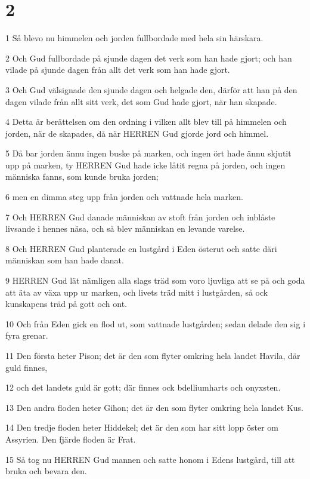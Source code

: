 \chapter{2}

\par 1 Så blevo nu himmelen och jorden fullbordade med hela sin härskara.
\par 2 Och Gud fullbordade på sjunde dagen det verk som han hade gjort; och han vilade på sjunde dagen från allt det verk som han hade gjort.
\par 3 Och Gud välsignade den sjunde dagen och helgade den, därför att han på den dagen vilade från allt sitt verk, det som Gud hade gjort, när han skapade.
\par 4 Detta är berättelsen om den ordning i vilken allt blev till på himmelen och jorden, när de skapades, då när HERREN Gud gjorde jord och himmel.
\par 5 Då bar jorden ännu ingen buske på marken, och ingen ört hade ännu skjutit upp på marken, ty HERREN Gud hade icke låtit regna på jorden, och ingen människa fanns, som kunde bruka jorden;
\par 6 men en dimma steg upp från jorden och vattnade hela marken.
\par 7 Och HERREN Gud danade människan av stoft från jorden och inblåste livsande i hennes näsa, och så blev människan en levande varelse.
\par 8 Och HERREN Gud planterade en lustgård i Eden österut och satte däri människan som han hade danat.
\par 9 HERREN Gud lät nämligen alla slags träd som voro ljuvliga att se på och goda att äta av växa upp ur marken, och livets träd mitt i lustgården, så ock kunskapens träd på gott och ont.
\par 10 Och från Eden gick en flod ut, som vattnade lustgården; sedan delade den sig i fyra grenar.
\par 11 Den första heter Pison; det är den som flyter omkring hela landet Havila, där guld finnes,
\par 12 och det landets guld är gott; där finnes ock bdelliumharts och onyxsten.
\par 13 Den andra floden heter Gihon; det är den som flyter omkring hela landet Kus.
\par 14 Den tredje floden heter Hiddekel; det är den som har sitt lopp öster om Assyrien. Den fjärde floden är Frat.
\par 15 Så tog nu HERREN Gud mannen och satte honom i Edens lustgård, till att bruka och bevara den.
